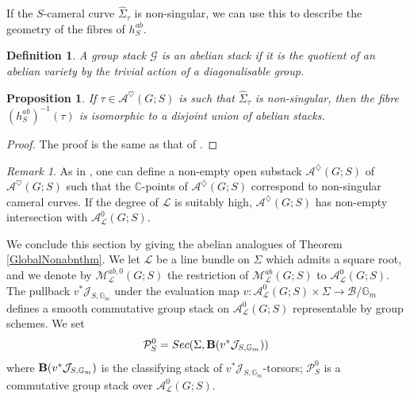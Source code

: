 \documentclass{amsart}
\newtheorem{proposition}[theorem]{Proposition}
\newtheorem{definition}[theorem]{Definition}
\theoremstyle{remark}
\newtheorem{remark}[theorem]{Remark}
\numberwithin{theorem}{section}
\numberwithin{equation}{section}
\begin{document}
If the $S$-cameral curve $\hat\Sigma_\tau$ is non-singular, we can use this to describe the geometry of the fibres of $h_S^{ab}$.

\begin{definition}\cite[Définition 4.6.5]{Ngo2}\label{AbelianStackdef}
    A group stack $\mathcal G$ is an \emph{abelian stack} if it is the quotient of an abelian variety by the trivial action of a diagonalisable group.
\end{definition}

\begin{proposition}\label{SmCameralCurveprp}
    If $\tau \in \mathcal A^\heartsuit(G;S)$ is such that $\hat\Sigma_\tau$ is non-singular, then the fibre $(h_S^{ab})^{-1}(\tau)$ is isomorphic to a disjoint union of abelian stacks.
\end{proposition}

\begin{proof}
The proof is the same as that of \cite[Proposition 4.8.2 (2)]{Ngo2}.
\end{proof}

\begin{remark}\label{SmCameralCurvermk}
    As in \cite[Section 4.6]{Ngo2}, one can define a non-empty open substack $\mathcal A^\diamondsuit(G;S)$ of $\mathcal A^\heartsuit(G;S)$ such that the $\mathbb{C}$-points of $\mathcal A^\diamondsuit(G;S)$ correspond to non-singular cameral curves. If the degree of $\mathcal L$ is suitably high, $\mathcal A^\diamondsuit(G;S)$ has non-empty intersection with $\mathcal A_\mathcal L^0(G;S).$
\end{remark}

We conclude this section by giving the abelian analogues of Theorem \ref{GlobalNonabnthm}. We let $\mathcal L$ be a line bundle on $\Sigma$ which admits a square root, and we denote by $\mathcal M_\mathcal L^{ab,0}(G;S)$ the restriction of $\mathcal M_\mathcal L^{ab}(G;S)$ to $\mathcal A_\mathcal L^0(G;S)$. The pullback $v^*\mathcal J_{S, \mathbb{G}_m}$ under the evaluation map $v:\mathcal A_\mathcal L^0(G;S) \times \Sigma \rightarrow \mathcal B/\mathbb{G}_m$ defines a smooth commutative group stack on $\mathcal A_\mathcal L^0(G;S)$ representable by group schemes. We set
\begin{equation}\label{SPicardeqn}
    \mathcal P^0_S = Sec(\Sigma, {\bf B}(v^*\mathcal J_{S,\mathbb{G}_m}))
\end{equation}
where ${\bf B}(v^*\mathcal J_{S,\mathbb{G}_m})$ is the classifying stack of $v^*\mathcal J_{S,\mathbb{G}_m}$-torsors; $\mathcal P_S^0$ is a commutative group stack over $\mathcal A_\mathcal L^0(G;S)$.
\end{document}
